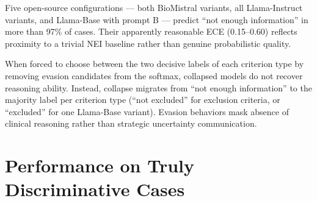 %

\begin{finding}
    Five open-source configurations --- both BioMistral variants, all
    Llama-Instruct variants, and Llama-Base with prompt B --- predict
    ``not enough information'' in more than 97\% of cases. Their apparently
    reasonable ECE (0.15–0.60) reflects proximity to a trivial NEI baseline
    rather than genuine probabilistic quality.
\end{finding}

\begin{finding}
    When forced to choose between the two decisive labels of each criterion
    type by removing evasion candidates from the softmax, collapsed models
    do not recover reasoning ability. Instead, collapse migrates from
    ``not enough information'' to the majority label per criterion type
    (``not excluded'' for exclusion criteria, or ``excluded'' for one
    Llama-Base variant). Evasion behaviors mask absence of clinical
    reasoning rather than strategic uncertainty communication.
\end{finding}

\section{Performance on Truly Discriminative Cases}
\label{sec:res-non-trivial}


